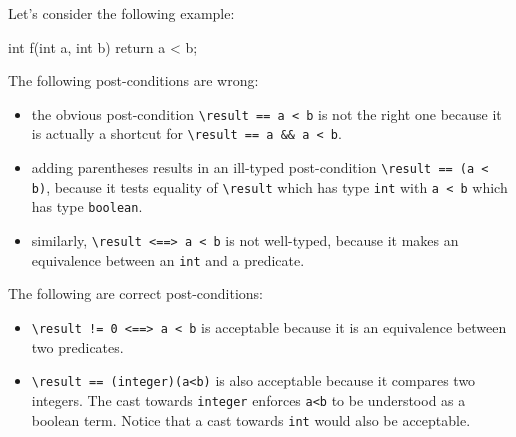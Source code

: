 

Let's consider the following example:
\begin{c}
  int f(int a, int b) { return a < b; }
\end{c}
The following post-conditions are wrong:
\begin{itemize}
\item the obvious post-condition \verb|\result == a < b| is not the
  right one because it is 
  actually a shortcut for \verb|\result == a && a < b|.
\item adding parentheses results in an ill-typed post-condition
  \verb|\result == (a < b)|, 
  because it tests equality of \verb|\result| which has
  type \verb|int| with \verb|a < b| which has type \verb|boolean|.
\item similarly, \verb|\result <==> a < b| is not well-typed, because
  it makes an equivalence between an \verb|int| and a predicate.  
\end{itemize}
The following are correct post-conditions:
\begin{itemize}
\item \verb|\result != 0 <==> a < b| is acceptable because it is an
  equivalence between two predicates.
\item \verb|\result == (integer)(a<b)| is also acceptable because it compares
  two integers. The cast towards \verb|integer| enforces
  \verb|a<b| to be understood as a boolean term. Notice that a cast
  towards \verb|int| would also be acceptable. 
\end{itemize}

